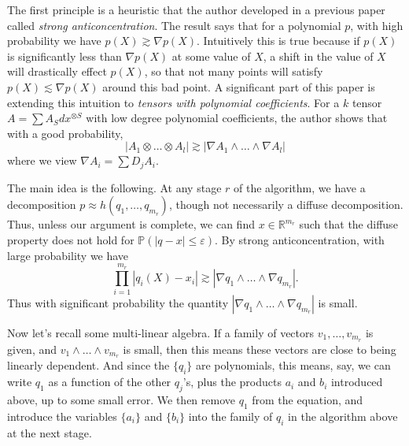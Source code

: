 \documentclass[12pt]{article}
\begin{document}
The first principle is a heuristic that the author developed in a previous paper called \emph{strong anticoncentration}. The result says that for a polynomial $p$, with high probability we have $p(X) \gtrsim \nabla p(X)$. Intuitively this is true because if $p(X)$ is significantly less than $\nabla p(X)$ at some value of $X$, a shift in the value of $X$ will drastically effect $p(X)$, so that not many points will satisfy $p(X) \lesssim \nabla p(X)$ around this bad point.  A significant part of this paper is extending this intuition to \emph{tensors with polynomial coefficients}. For a $k$ tensor $A = \sum A_S dx^{\otimes S}$ with low degree polynomial coefficients, the author shows that with a good probability,
%
\[ |A_1 \otimes \dots \otimes A_l| \gtrsim | \nabla A_1 \wedge \dots \wedge \nabla A_l | \]
%
where we view $\nabla A_i = \sum D_j A_i$.

The main idea is the following. At any stage $r$ of the algorithm, we have a decomposition $p \approx h(q_1,\dots,q_{m_r})$, though not necessarily a diffuse decomposition. Thus, unless our argument is complete, we can find $x \in \mathbb{R}^{m_r}$ such that the diffuse property does not hold for $\mathbb{P}(|q - x| \leq \varepsilon)$. By strong anticoncentration, with large probability we have
%
\[ \prod_{i = 1}^{m_r} |q_i(X) - x_i| \gtrsim |\nabla q_1 \wedge \dots \wedge \nabla q_{m_r}|. \]
%
Thus with significant probability the quantity $|\nabla q_1 \wedge \dots \wedge \nabla q_{m_r}|$ is small.

Now let's recall some multi-linear algebra. If a family of vectors $v_1,\dots,v_{m_r}$ is given, and $v_1 \wedge \dots \wedge v_{m_r}$ is small, then this means these vectors are close to being linearly dependent. And since the $\{ q_i \}$ are polynomials, this means, say, we can write $q_1$ as a function of the other $q_j$'s, plus the products $a_i$ and $b_i$ introduced above, up to some small error. We then remove $q_1$ from the equation, and introduce the variables $\{ a_i \}$ and $\{ b_i \}$ into the family of $q_i$ in the algorithm above at the next stage.
\end{document}

